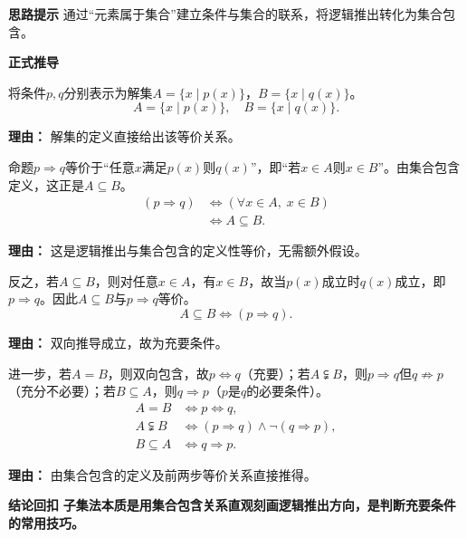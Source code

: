 \begin{proofbox}
	\textbf{\textcolor{CProof}{思路提示}}
	通过“元素属于集合”建立条件与集合的联系，将逻辑推出转化为集合包含。

	\medskip
	\textbf{\textcolor{CProof}{正式推导}}
	\begin{description}[style=nextline, leftmargin=2.8em, labelsep=0.5em, itemsep=0.55em]
		\item[\textbf{步骤一（条件集合化）：}]
			将条件$p,q$分别表示为解集$A=\{x\mid p(x)\}$，$B=\{x\mid q(x)\}$。
			\[
				A=\{x\mid p(x)\},\quad B=\{x\mid q(x)\}.
			\]
			\par\textbf{理由：} 解集的定义直接给出该等价关系。
		\item[\textbf{步骤二（转化推出关系）：}]
			命题$p\Rightarrow q$等价于“任意$x$满足$p(x)$则$q(x)$”，即“若$x\in A$则$x\in B$”。由集合包含定义，这正是$A\subseteq B$。
			\[
				\begin{aligned}
					(p\Rightarrow q) &\Leftrightarrow (\forall x\in A,\; x\in B) \\ &\Leftrightarrow A\subseteq B.
			\end{aligned}
			\]
			\par\textbf{理由：} 这是逻辑推出与集合包含的定义性等价，无需额外假设。
		\item[\textbf{步骤三（反向验证）：}]
			反之，若$A\subseteq B$，则对任意$x\in A$，有$x\in B$，故当$p(x)$成立时$q(x)$成立，即$p\Rightarrow q$。因此$A\subseteq B$与$p\Rightarrow q$等价。
			\[
				A\subseteq B \Leftrightarrow (p\Rightarrow q).
			\]
			\par\textbf{理由：} 双向推导成立，故为充要条件。
		\item[\textbf{步骤四（特殊情况分类）：}]
			进一步，若$A=B$，则双向包含，故$p\Leftrightarrow q$（充要）；若$A\subsetneqq B$，则$p\Rightarrow q$但$q\not\Rightarrow p$（充分不必要）；若$B\subseteq A$，则$q\Rightarrow p$（$p$是$q$的必要条件）。
			\[
				\begin{aligned}
					A=B &\Leftrightarrow p\Leftrightarrow q,\\ A\subsetneqq B &\Leftrightarrow (p\Rightarrow q)\land\lnot(q\Rightarrow p),\\ B\subseteq A &\Leftrightarrow q\Rightarrow p.
			\end{aligned}
			\]
			\par\textbf{理由：} 由集合包含的定义及前两步等价关系直接推得。
	\end{description}

	\medskip
	\textbf{\textcolor{CProof}{结论回扣}}
	\textbf{子集法本质是用集合包含关系直观刻画逻辑推出方向，是判断充要条件的常用技巧。}
\end{proofbox}

